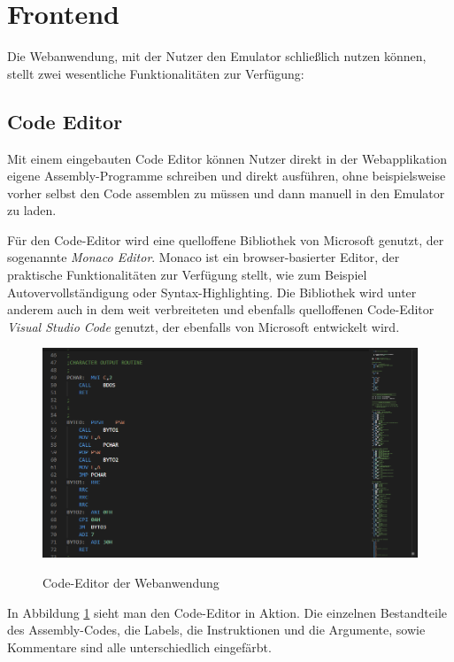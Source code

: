 \section{Frontend}

Die Webanwendung, mit der Nutzer den Emulator schließlich nutzen können, stellt zwei wesentliche Funktionalitäten zur Verfügung:

\subsection{Code Editor}

Mit einem eingebauten Code Editor können Nutzer direkt in der Webapplikation eigene Assembly-Programme schreiben und direkt ausführen, ohne beispielsweise vorher selbst den Code assemblen zu müssen und dann manuell in den Emulator zu laden.

Für den Code-Editor wird eine quelloffene Bibliothek von Microsoft genutzt, der sogenannte \textit{Monaco Editor}. Monaco ist ein browser-basierter Editor, der praktische Funktionalitäten zur Verfügung stellt, wie zum Beispiel Autovervollständigung oder Syntax-Highlighting. Die Bibliothek wird unter anderem auch in dem weit verbreiteten und ebenfalls quelloffenen Code-Editor \textit{Visual Studio Code} genutzt, der ebenfalls von Microsoft entwickelt wird.

\begin{figure}
    \caption{Code-Editor der Webanwendung}
    \centering
    \includegraphics[width=1.0\textwidth]{Bilder/CodeEditor.png}
    \label{fig:codeeditor}
\end{figure}

In Abbildung \ref{fig:codeeditor} sieht man den Code-Editor in Aktion. Die einzelnen Bestandteile des Assembly-Codes, die Labels, die Instruktionen und die Argumente, sowie Kommentare sind alle unterschiedlich eingefärbt.

